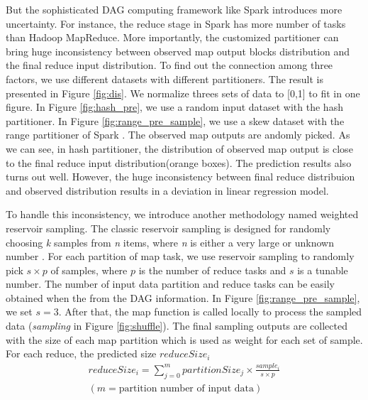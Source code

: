 But the sophisticated DAG computing framework like Spark introduces more uncertainty. For instance, the reduce stage in Spark has more number of tasks than Hadoop MapReduce. More importantly, the customized partitioner can bring huge inconsistency between observed map output blocks distribution and the final reduce input distribution. To find out the connection among three factors, we use different datasets with different partitioners. The result is presented in Figure \ref{fig:dis}. We normalize threes sets of data to [0,1] to fit in one figure. In Figure \ref{fig:hash_pre}, we use a random input dataset with the hash partitioner. In Figure \ref{fig:range_pre_sample}, we use a skew dataset with the range partitioner of Spark \cite{sparksource}.
The observed map outputs are andomly picked. As we can see, in hash partitioner, the distribution of observed map output is close to the final reduce input distribution(orange boxes). The prediction results also turns out well. However, the huge inconsistency between final reduce distribuion and observed distribution results in a deviation in linear regression model.

To handle this inconsistency, we introduce another methodology named weighted reservoir sampling. The classic reservoir sampling is designed for randomly choosing \textit{k} samples from \textit{n} items, where \textit{n} is either a very large or unknown number \cite{reservoir}. For each partition of map task, we use reservoir sampling to randomly pick $s \times p$ of samples, where $p$ is the number of reduce tasks and $s$ is a tunable number. The number of input data partition and reduce tasks can be easily obtained when the from the DAG information. In Figure \ref{fig:range_pre_sample}, we set $s = 3$. After that, the map function is called locally to process the sampled data (\textit{sampling} in Figure \ref{fig:shuffle}). The final sampling outputs are collected with the size of each map partition which is used as weight for each set of sample. For each reduce, the predicted size $reduceSize_i$
\begin{equation}
\label{equationsample} 
\begin{aligned}
	reduceSize_i = {\displaystyle\sum_{j=0}^{m} {partitionSize_j \times \frac{sample_i}{s \times p}}} \\ 
	{\left( m = \text{partition number of input data} \right)}
\end{aligned}
\end{equation}


